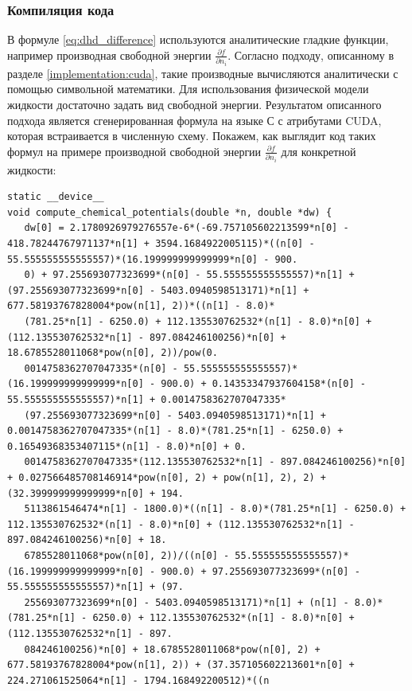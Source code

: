 \subsubsection*{Компиляция кода}
В формуле \eqref{eq:dhd_difference} используются аналитические гладкие функции, например производная свободной энергии $\frac{\partial f}{\partial n_i}$. Согласно подходу, описанному в разделе \ref{implementation:cuda}, такие производные вычисляются аналитически с помощью символьной математики. Для использования физической модели жидкости достаточно задать вид свободной энергии. Результатом описанного подхода является сгенерированная формула на языке С с атрибутами CUDA, которая встраивается в численную схему. Покажем, как выглядит код таких формул на примере производной свободной энергии $\frac{\partial f}{\partial n_i}$ для конкретной жидкости:
\begin{lstlisting}[style=CStyle]
static __device__
void compute_chemical_potentials(double *n, double *dw) {
   dw[0] = 2.1780926979276557e-6*(-69.757105602213599*n[0] - 418.78244767971137*n[1] + 3594.1684922005115)*((n[0] - 55.555555555555557)*(16.199999999999999*n[0] - 900.
   0) + 97.255693077323699*(n[0] - 55.555555555555557)*n[1] + (97.255693077323699*n[0] - 5403.0940598513171)*n[1] + 677.58193767828004*pow(n[1], 2))*((n[1] - 8.0)*
   (781.25*n[1] - 6250.0) + 112.135530762532*(n[1] - 8.0)*n[0] + (112.135530762532*n[1] - 897.084246100256)*n[0] + 18.6785528011068*pow(n[0], 2))/pow(0.
   0014758362707047335*(n[0] - 55.555555555555557)*(16.199999999999999*n[0] - 900.0) + 0.14353347937604158*(n[0] - 55.555555555555557)*n[1] + 0.0014758362707047335*
   (97.255693077323699*n[0] - 5403.0940598513171)*n[1] + 0.0014758362707047335*(n[1] - 8.0)*(781.25*n[1] - 6250.0) + 0.16549368353407115*(n[1] - 8.0)*n[0] + 0.
   0014758362707047335*(112.135530762532*n[1] - 897.084246100256)*n[0] + 0.027566485708146914*pow(n[0], 2) + pow(n[1], 2), 2) + (32.399999999999999*n[0] + 194.
   5113861546474*n[1] - 1800.0)*((n[1] - 8.0)*(781.25*n[1] - 6250.0) + 112.135530762532*(n[1] - 8.0)*n[0] + (112.135530762532*n[1] - 897.084246100256)*n[0] + 18.
   6785528011068*pow(n[0], 2))/((n[0] - 55.555555555555557)*(16.199999999999999*n[0] - 900.0) + 97.255693077323699*(n[0] - 55.555555555555557)*n[1] + (97.
   255693077323699*n[0] - 5403.0940598513171)*n[1] + (n[1] - 8.0)*(781.25*n[1] - 6250.0) + 112.135530762532*(n[1] - 8.0)*n[0] + (112.135530762532*n[1] - 897.
   084246100256)*n[0] + 18.6785528011068*pow(n[0], 2) + 677.58193767828004*pow(n[1], 2)) + (37.357105602213601*n[0] + 224.271061525064*n[1] - 1794.168492200512)*((n

\end{lstlisting}
